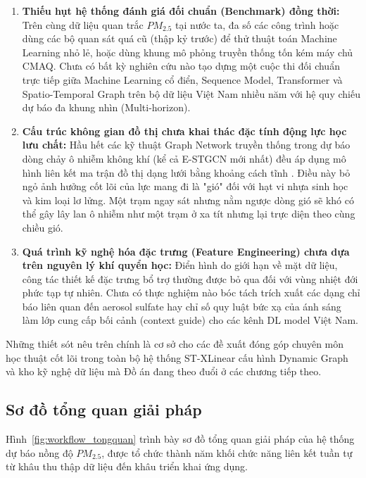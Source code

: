 \begin{enumerate}
    \item \textbf{Thiếu hụt hệ thống đánh giá đối chuẩn (Benchmark) đồng thời:} Trên cùng dữ liệu quan trắc $PM_{2.5}$ tại nước ta, đa số các công trình hoặc dùng các bộ quan sát quá cũ (thập kỷ trước) để thử thuật toán Machine Learning nhỏ lẻ, hoặc dùng khung mô phỏng truyền thống tốn kém máy chủ CMAQ. Chưa có bất kỳ nghiên cứu nào tạo dựng một cuộc thi đối chuẩn trực tiếp giữa Machine Learning cổ điển, Sequence Model, Transformer và Spatio-Temporal Graph trên bộ dữ liệu Việt Nam nhiều năm với hệ quy chiếu dự báo đa khung nhìn (Multi-horizon).
    
    \item \textbf{Cấu trúc không gian đồ thị chưa khai thác đặc tính động lực học lưu chất:} Hầu hết các kỹ thuật Graph Network truyền thống trong dự báo dòng chảy ô nhiễm không khí (kể cả E-STGCN mới nhất) đều áp dụng mô hình liên kết ma trận đồ thị dạng lưới bằng khoảng cách tĩnh \cite{panja2025estgcn}. Điều này bỏ ngỏ ảnh hưởng cốt lõi của lực mang đi là "gió" đối với hạt vi nhựa sinh học và kim loại lơ lửng. Một trạm ngay sát nhưng nằm ngược dòng gió sẽ khó có thể gây lây lan ô nhiễm như một trạm ở xa tít nhưng lại trực diện theo cùng chiều gió.
    
    \item \textbf{Quá trình kỹ nghệ hóa đặc trưng (Feature Engineering) chưa dựa trên nguyên lý khí quyển học:} Điển hình do giới hạn về mặt dữ liệu, công tác thiết kế đặc trưng bổ trợ thường được bỏ qua đối với vùng nhiệt đới phức tạp tự nhiên. Chưa có thực nghiệm nào bóc tách trích xuất các dạng chỉ báo liên quan đến aerosol sulfate hay chỉ số quy luật bức xạ của ánh sáng làm lớp cung cấp bối cảnh (context guide) cho các kênh DL model Việt Nam.
\end{enumerate}

Những thiết sót nêu trên chính là cơ sở cho các đề xuất đóng góp chuyên môn học thuật cốt lõi trong toàn bộ hệ thống ST-XLinear cấu hình Dynamic Graph và kho kỹ nghệ dữ liệu mà Đồ án đang theo đuổi ở các chương tiếp theo.

\subsection{Sơ đồ tổng quan giải pháp}

Hình~\ref{fig:workflow_tongquan} trình bày sơ đồ tổng quan giải pháp của hệ thống dự báo nồng độ $PM_{2.5}$, được tổ chức thành năm khối chức năng liên kết tuần tự từ khâu thu thập dữ liệu đến khâu triển khai ứng dụng.

